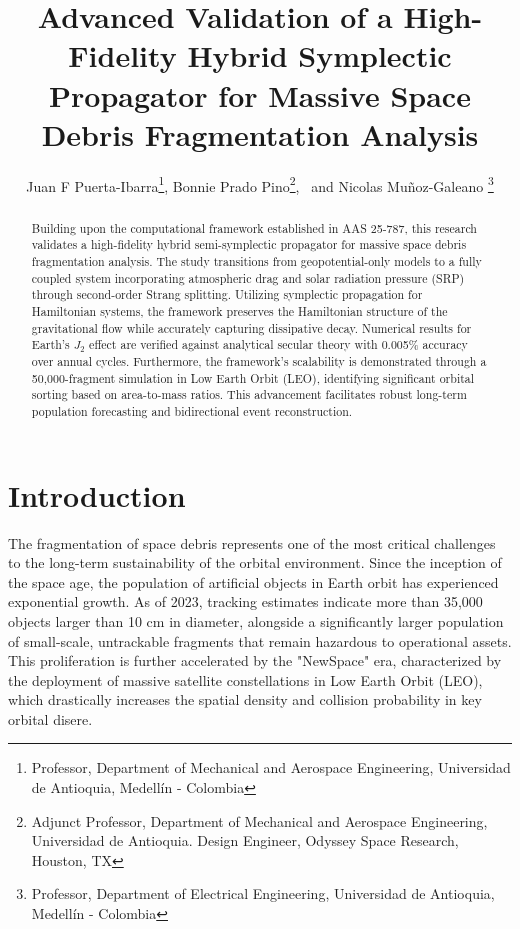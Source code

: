 \documentclass[letterpaper, paper,11pt]{AAS}
\begin{document}
\title{Advanced Validation of a High-Fidelity Hybrid Symplectic Propagator for Massive Space Debris Fragmentation Analysis}

\author{Juan F Puerta-Ibarra\thanks{Professor, Department of Mechanical and Aerospace Engineering, Universidad de Antioquia, Medellín - Colombia},  
Bonnie Prado Pino\thanks{Adjunct Professor, Department of Mechanical and Aerospace Engineering, Universidad de Antioquia. Design Engineer, Odyssey Space Research, Houston, TX},
\ and Nicolas Muñoz-Galeano \thanks{Professor, Department of Electrical Engineering, Universidad de Antioquia, Medellín - Colombia}
}

\maketitle

\begin{abstract}
Building upon the computational framework established in AAS 25-787\cite{puerta-ibarra_advanced_nodate}, this research validates a high-fidelity hybrid semi-symplectic propagator for massive space debris fragmentation analysis. The study transitions from geopotential-only models to a fully coupled system incorporating atmospheric drag and solar radiation pressure (SRP) through second-order Strang splitting. Utilizing symplectic propagation for Hamiltonian systems, the framework preserves the Hamiltonian structure of the gravitational flow while accurately capturing dissipative decay. Numerical results for Earth's $J_2$ effect are verified against analytical secular theory with 0.005\% accuracy over annual cycles. Furthermore, the framework's scalability is demonstrated through a 50,000-fragment simulation in Low Earth Orbit (LEO), identifying significant orbital sorting based on area-to-mass ratios. This advancement facilitates robust long-term population forecasting and bidirectional event reconstruction.
\end{abstract}

\section{Introduction}
The fragmentation of space debris represents one of the most critical challenges to the long-term sustainability of the orbital environment. Since the inception of the space age, the population of artificial objects in Earth orbit has experienced exponential growth. As of 2023, tracking estimates indicate more than 35,000 objects larger than 10 cm in diameter, alongside a significantly larger population of small-scale, untrackable fragments that remain hazardous to operational assets\cite{european_space_agency_space_nodate}. This proliferation is further accelerated by the "NewSpace" era, characterized by the deployment of massive satellite constellations in Low Earth Orbit (LEO), which drastically increases the spatial density and collision probability in key orbital disere\cite{diserens_newspace_2020}.
\end{document}
